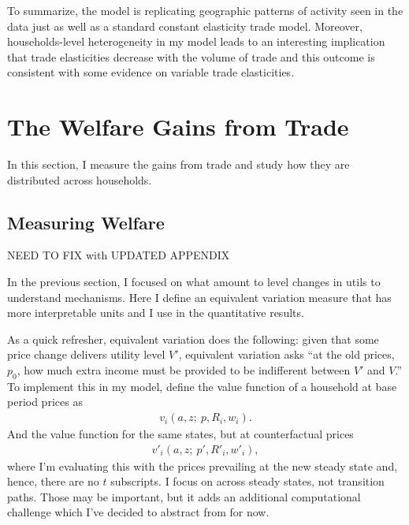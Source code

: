 \documentclass[12pt,pdftex]{article}
\begin{document}
\begin{onehalfspacing}
To summarize, the model is replicating geographic patterns of activity seen in the data just as well as a standard constant elasticity trade model. Moreover, households-level heterogeneity in my model leads to an interesting implication that trade elasticities decrease with the volume of trade and this outcome is consistent with some evidence on variable trade elasticities.

\section{The Welfare Gains from Trade}

In this section, I measure the gains from trade and study how they are distributed across households.

\subsection{Measuring Welfare}

NEED TO FIX with UPDATED APPENDIX

In the previous section, I focused on what amount to level changes in utils to understand mechanisms. Here I define an equivalent variation measure that has more interpretable units and I use in the quantitative results.

As a quick refresher, equivalent variation does the following: given that some price change delivers utility level $V'$, equivalent variation asks ``at the old prices, $p_0$, how much extra income must be provided to be indifferent between $V'$ and $V$.'' To implement this in my model, define the value function of a household at base period prices as
\begin{align}
v_i(a, z ; \ p, R_{i}, w_{i}).
\end{align}
And the value function for the same states, but at counterfactual prices
\begin{align}
v'_i(a, z ; \ p', R'_{i}, w'_{i}), \label{eq:welfare-eqv-cftc}
\end{align}
where I'm evaluating this with the prices prevailing at the new steady state and, hence, there are no $t$ subscripts. I focus on across steady states, not transition paths. Those may be important, but it adds an additional computational challenge which I've decided to abstract from for now.


\end{onehalfspacing}
\end{document}
